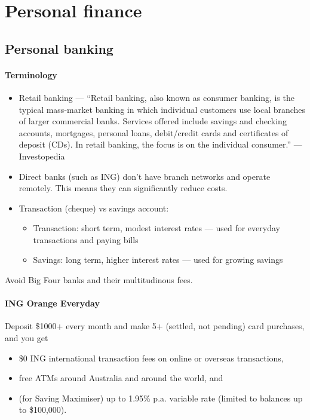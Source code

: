 \documentclass[oneside]{book}
\begin{document}
\tableofcontents

\chapter{Personal finance}

\section{Personal banking}

\subsubsection{Terminology}

\begin{itemize}
	\item Retail banking --- ``Retail banking, also known as consumer banking, is the typical mass-market banking in which individual customers use local branches of larger commercial banks. Services offered include savings and checking accounts, mortgages, personal loans, debit/credit cards and certificates of deposit (CDs). In retail banking, the focus is on the individual consumer.'' --- Investopedia \cite{investopedia_retail_banking}
	\item Direct banks (such as ING) don't have branch networks and operate remotely. This means they can significantly reduce costs.
	\item Transaction (cheque) vs savings account:
	\begin{itemize}
		\item Transaction: short term, modest interest rates --- used for everyday transactions and paying bills
		\item Savings: long term, higher interest rates --- used for growing savings
	\end{itemize}
\end{itemize}

Avoid Big Four banks and their multitudinous fees.

\subsubsection{ING Orange Everyday}
Deposit \$1000+ every month and make 5+ (settled, not pending) card purchases, and you get
\begin{itemize}
	\item \$0 ING international transaction fees on online or overseas transactions,
	\item free ATMs around Australia and around the world, and
	\item (for Saving Maximiser) up to 1.95\% p.a. variable rate (limited to balances up to \$100,000).
\end{itemize}
\end{document}
